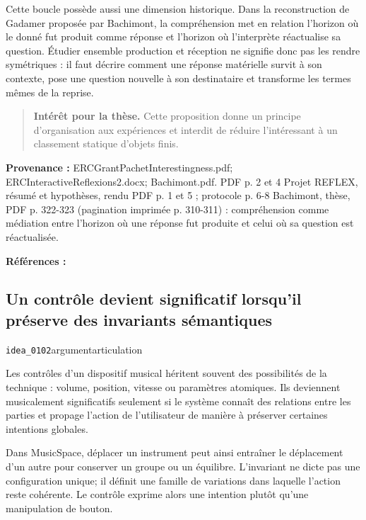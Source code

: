 \documentclass[10pt,a4paper]{article}
\begin{document}
Cette boucle possède aussi une dimension historique. Dans la reconstruction de Gadamer proposée par Bachimont, la compréhension met en relation l'horizon où le donné fut produit comme réponse et l'horizon où l'interprète réactualise sa question. Étudier ensemble production et réception ne signifie donc pas les rendre symétriques : il faut décrire comment une réponse matérielle survit à son contexte, pose une question nouvelle à son destinataire et transforme les termes mêmes de la reprise.

\begin{quote}
\textbf{Intérêt pour la thèse.} Cette proposition donne un principe d'organisation aux expériences et interdit de réduire l'intéressant à un classement statique d'objets finis.
\end{quote}
{\footnotesize\color{metadata}\textbf{Provenance :} ERCGrantPachetInterestingness.pdf; ERCInteractiveReflexions2.docx; Bachimont.pdf. PDF p. 2 et 4 Projet REFLEX, résumé et hypothèses, rendu PDF p. 1 et 5 ; protocole p. 6-8 Bachimont, thèse, PDF p. 322-323 (pagination imprimée p. 310-311) : compréhension comme médiation entre l'horizon où une réponse fut produite et celui où sa question est réactualisée.\par}
{\footnotesize\color{metadata}\textbf{Références :} \parencite{bachimont1996hermeneutique}\par}

\subsection{Un contrôle devient significatif lorsqu'il préserve des invariants sémantiques}
{\small\color{metadata} \texttt{idea\_0102}\quad\textbullet\quad argument\quad\textbullet\quad articulation\par}

Les contrôles d'un dispositif musical héritent souvent des possibilités de la technique : volume, position, vitesse ou paramètres atomiques. Ils deviennent musicalement significatifs seulement si le système connaît des relations entre les parties et propage l'action de l'utilisateur de manière à préserver certaines intentions globales.

Dans MusicSpace, déplacer un instrument peut ainsi entraîner le déplacement d'un autre pour conserver un groupe ou un équilibre. L'invariant ne dicte pas une configuration unique; il définit une famille de variations dans laquelle l'action reste cohérente. Le contrôle exprime alors une intention plutôt qu'une manipulation de bouton.
\end{document}
